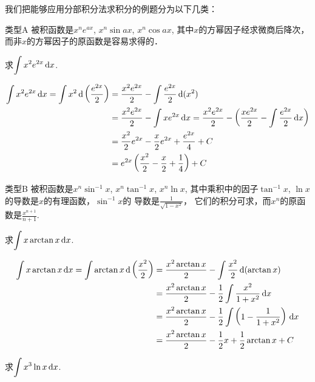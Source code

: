 我们把能够应用分部积分法求积分的例题分为以下几类：

\begin{blk}
 {类型A} 被积函数是$x^ne^{ax}$, $x^n\sin ax$, $x^n\cos ax$, 其中$x$的方幂因子经求微商后降次，而非$x$的方幂因子的原函数是容易求得的．   
\end{blk}

\begin{example}
求$\displaystyle\int x^2 e^{2x}\,{\rm d} x$.
\end{example}

\begin{solution}
\[\begin{split}
    \displaystyle\int x^2 e^{2x}\,{\rm d} x=\int x^2 \,{\rm d}\left(\dfrac{e^{2x}}{2}\right)&=\dfrac{x^2e^{2x}}{2}-\int \dfrac{e^{2x}}{2}\,{\rm d}(x^2)\\
&=\dfrac{x^2e^{2x}}{2}-\int xe^{2x}\,{\rm d} x=\dfrac{x^2e^{2x}}{2}-\left(\dfrac{xe^{2x}}{2}-\int \dfrac{e^{2x}}{2}\,{\rm d} x\right)\\
&=\dfrac{x^2}{2}e^{2x}-\dfrac{x}{2}e^{2x}+\dfrac{e^{2x}}{4}+C\\    
&=e^{2x}\left(\dfrac{x^2}{2}-\dfrac{x}{2}+\dfrac{1}{4}\right)+C
\end{split}\]
\end{solution}

\begin{blk}
    {类型B} 被积函数是$x^n\sin^{-1}x$, $x^n\tan^{-1}x$, $x^n\ln x$, 其中乘积中的因子$\tan^{-1} x$, $\ln x$的导数是$x$的有理函数，$\sin^{-1}x$的
导数是$\frac{1}{\sqrt{1-x^2}}$，
它们的积分可求，而$x^n$的原函数是$\frac{x^{n+1}}{n+1}$.
\end{blk}


\begin{example}
求$\displaystyle\int x\arctan x\,{\rm d} x$.    
\end{example}

\begin{solution}
  \[\begin{split}
    \displaystyle\int x\arctan x\,{\rm d} x=\int \arctan x \,{\rm d}\left(\dfrac{x^2}{2}\right)&=\dfrac{x^2\arctan x}{2}-\int \dfrac{x^2}{2}\,{\rm d}(\arctan x)\\
    &=\dfrac{x^2\arctan x}{2}-\dfrac{1}{2}\int \dfrac{x^2}{1+x^2}\,{\rm d} x\\
    &=\dfrac{x^2\arctan x}{2}-\dfrac{1}{2}\int \left(1-\dfrac{1}{1+x^2}\right)\,{\rm d} x\\
    &=\dfrac{x^2\arctan x}{2}-\dfrac{1}{2}x+\dfrac{1}{2}\arctan x+C
  \end{split}\]  
\end{solution}


\begin{example}
    求$\displaystyle\int x^3\ln x\,{\rm d} x$.
\end{example}

